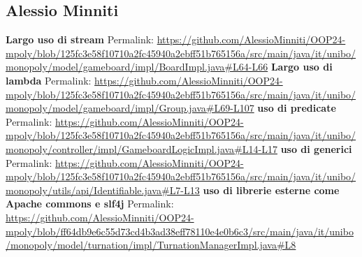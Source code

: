 \subsection{Alessio Minniti}
\textbf{Largo uso di stream}\newline
Permalink: \url{https://github.com/AlessioMinniti/OOP24-mpoly/blob/125fc3e58f10710a2fc45940a2ebff51b765156a/src/main/java/it/unibo/monopoly/model/gameboard/impl/BoardImpl.java#L64-L66}\newline\newline
\textbf{Largo uso di lambda}\newline
Permalink: \url{https://github.com/AlessioMinniti/OOP24-mpoly/blob/125fc3e58f10710a2fc45940a2ebff51b765156a/src/main/java/it/unibo/monopoly/model/gameboard/impl/Group.java#L69-L107}\newline\newline
\textbf{uso di predicate}\newline
Permalink: \url{https://github.com/AlessioMinniti/OOP24-mpoly/blob/125fc3e58f10710a2fc45940a2ebff51b765156a/src/main/java/it/unibo/monopoly/controller/impl/GameboardLogicImpl.java#L14-L17}\newline\newline\newline
\textbf{uso di generici}\newline
Permalink: \url{https://github.com/AlessioMinniti/OOP24-mpoly/blob/125fc3e58f10710a2fc45940a2ebff51b765156a/src/main/java/it/unibo/monopoly/utils/api/Identifiable.java#L7-L13}\newline\newline
\textbf{uso di librerie esterne come Apache commons e slf4j}\newline
Permalink: \url{https://github.com/AlessioMinniti/OOP24-mpoly/blob/ff64db9e6c55d73cd4b3ad38eff78110e4e0b6c3/src/main/java/it/unibo/monopoly/model/turnation/impl/TurnationManagerImpl.java#L8}